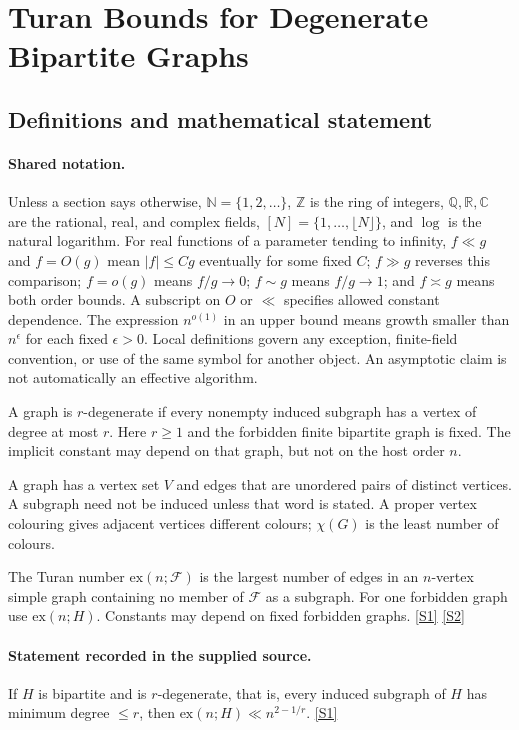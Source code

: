 \documentclass[11pt,a4paper]{article}
\newcommand{\N}{\mathbb{N}}
\newcommand{\Z}{\mathbb{Z}}
\newcommand{\Q}{\mathbb{Q}}
\newcommand{\R}{\mathbb{R}}
\newcommand{\C}{\mathbb{C}}
\newcommand{\sref}[2]{\hyperlink{source:#1:#2}{[S#2]}}
\begin{document}
\section{Turan Bounds for Degenerate Bipartite Graphs}\label{statement}


\subsection{Definitions and mathematical statement}

\paragraph{Shared notation.}Unless a section says otherwise, $\N=\{1,2,\ldots\}$,
$\Z$ is the ring of integers, $\Q,\R,\C$ are the rational, real, and complex
fields, $[N]=\{1,\ldots,\lfloor N\rfloor\}$, and $\log$ is the natural
logarithm. For real functions of a parameter tending to infinity,
$f\ll g$ and $f=O(g)$ mean $|f|\leq Cg$ eventually for some fixed $C$;
$f\gg g$ reverses this comparison; $f=o(g)$ means $f/g\to0$;
$f\sim g$ means $f/g\to1$; and $f\asymp g$ means both order bounds.
A subscript on $O$ or $\ll$ specifies allowed constant dependence.
The expression $n^{o(1)}$ in an upper bound means growth smaller than
$n^\epsilon$ for each fixed $\epsilon>0$. Local definitions govern any
exception, finite-field convention, or use of the same symbol for another
object. An asymptotic claim is not automatically an effective algorithm.



A graph is $r$-degenerate if every nonempty induced subgraph has a vertex of degree at most $r$. Here $r\geq1$ and the forbidden finite bipartite graph is fixed. The implicit constant may depend on that graph, but not on the host order $n$.

A graph has a vertex set $V$ and edges that are unordered pairs of distinct vertices. A subgraph need not be induced unless that word is stated. A proper vertex colouring gives adjacent vertices different colours; $\chi(G)$ is the least number of colours.

The Turan number $\mathrm{ex}(n;\mathcal F)$ is the largest number of edges in an $n$-vertex simple graph containing no member of $\mathcal F$ as a subgraph. For one forbidden graph use $\mathrm{ex}(n;H)$. Constants may depend on fixed forbidden graphs. \sref{statement}{1} \sref{statement}{2}

\paragraph{Statement recorded in the supplied source.}
If $H$ is bipartite and is $r$-degenerate, that is, every induced subgraph of $H$ has minimum degree $\leq r$, then $ \mathrm{ex}(n;H) \ll n^{2-1/r}. $ \sref{statement}{1}
\end{document}
